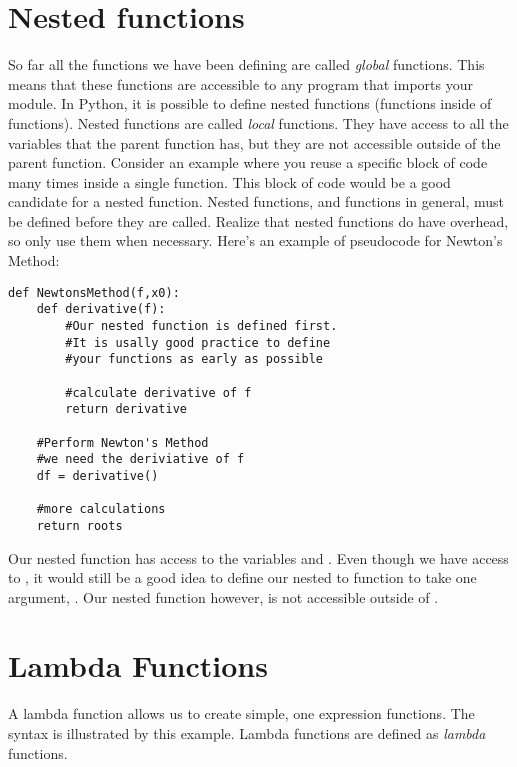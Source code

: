 

\section*{Nested functions}
So far all the functions we have been defining are called \emph{global} functions.  This means that these functions are accessible to any program that imports your module.  In Python, it is possible to define nested functions (functions inside of functions).  Nested functions are called \emph{local} functions.  They have access to all the variables that the parent function has, but they are not accessible outside of the parent function.  Consider an example where you reuse a specific block of code many times inside a single function.  This block of code would be a good candidate for a nested function.  Nested functions, and functions in general, must be defined before they are called. Realize that nested functions do have overhead, so only use them when necessary.  Here's an example of pseudocode for Newton's Method:

\begin{lstlisting}
def NewtonsMethod(f,x0):   
    def derivative(f):
        #Our nested function is defined first.
        #It is usally good practice to define
        #your functions as early as possible

        #calculate derivative of f
        return derivative
    
    #Perform Newton's Method
    #we need the deriviative of f
    df = derivative()

    #more calculations
    return roots
\end{lstlisting}

Our nested function  has access to the variables  and .  Even though we have access to , it would still be a good idea to define our nested to function to take one argument, .  Our nested function  however, is not accessible outside of .

\section*{Lambda Functions}
A lambda function allows us to create simple, one expression functions. The syntax is illustrated by this example.  Lambda functions are defined as \emph{lambda} functions.

